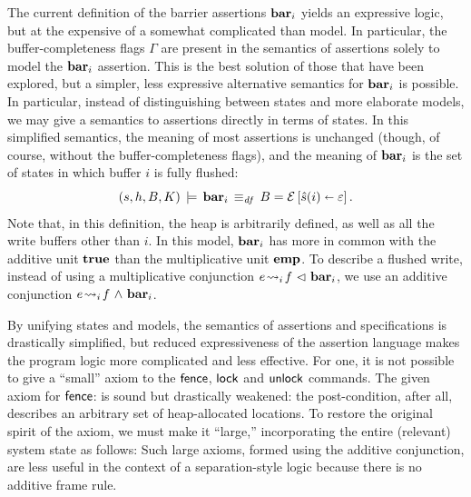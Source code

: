 \documentclass[11pt]{report}         %
\begin{document}
The current definition of the barrier assertions $\mathbf{bar}_{i}$ yields an expressive logic, but at the expensive of a somewhat complicated than model. In particular, the buffer-completeness flags $\Gamma$ are present in the semantics of assertions solely to model the $\mathbf{bar}_{i}$ assertion. This is the best solution of those that have been explored, but a simpler, less expressive alternative semantics for $\mathbf{bar}_{i}$ is possible. In particular, instead of distinguishing between states and more elaborate models, we may give a semantics to assertions directly in terms of states. In this simplified semantics, the meaning of most assertions is unchanged (though, of course, without the buffer-completeness flags), and the meaning of $\mathbf{bar}_{i}$ is the set of states in which buffer $i$ is fully flushed: \[ (s,h,B,K) \,\models\, \mathbf{bar}_{i} \operatorname{\;\equiv_{\mathit{df}}\;} B = \mathcal{E} \left[ \hat{s}(i) \shortleftarrow \varepsilon \right].\] Note that, in this definition, the heap is arbitrarily defined, as well as all the write buffers other than $i$. In this model, $\mathbf{bar}_{i}$ has more in common with the additive unit $\mathbf{true}$ than the multiplicative unit $\mathbf{emp}$. To describe a flushed write, instead of using a multiplicative conjunction $e \!\leadsto_{i}\! f \operatorname{\,\vartriangleleft\,} \mathbf{bar}_{i}$, we use an additive conjunction $e \!\leadsto_{i}\! f \operatorname{\,\wedge\,} \mathbf{bar}_{i}$. 

By unifying states and models, the semantics of assertions and specifications is drastically simplified, but reduced expressiveness of the assertion language makes the program logic more complicated and less effective. For one, it is not possible to give a ``small'' axiom to the $\operatorname{\mathsf{fence}}$, $\operatorname{\mathsf{lock}}$ and $\operatorname{\mathsf{unlock}}$ commands. The given axiom for $\operatorname{\mathsf{fence}}$:  is sound but drastically weakened: the post-condition, after all, describes an arbitrary set of heap-allocated locations. To restore the original spirit of the axiom, we must make it ``large,'' incorporating the entire (relevant) system state as follows:  Such large axioms, formed using the additive conjunction, are less useful in the context of a separation-style logic because there is no additive frame rule. 
\end{document}

